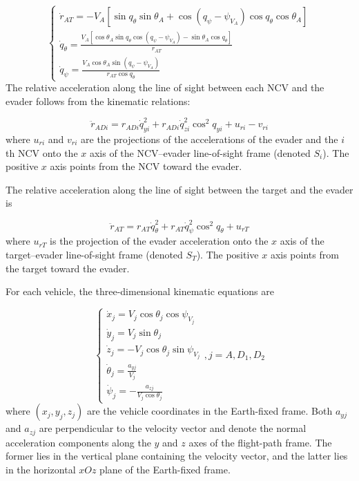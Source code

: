 \begin{equation}
\label{eq:2}
\left\{ {\begin{array}{*{20}{l}}
  {{{\dot r}_{AT}} =  - {V_A}\left[ {\sin {q_\theta }\sin {\theta _A} + \cos \left( {{q_\psi } - {\psi _{{V_A}}}} \right)\cos {q_\theta }\cos {\theta _A}} \right]} \\ 
  {{{\dot q}_\theta } = \frac{{{V_A}\left[ {\cos {\theta _A}\sin {q_\theta }\cos \left( {{q_\psi } - {\psi _{{V_A}}}} \right) - \sin {\theta _A}\cos {q_\theta }} \right]}}{{{r_{AT}}}}} \\ 
  {{{\dot q}_\psi } = \frac{{{V_A}\cos {\theta _A}\sin \left( {{q_\psi } - {\psi _{{V_A}}}} \right)}}{{{r_{AT}}\cos {q_\theta }}}} 
\end{array}} \right.
\end{equation}
The relative acceleration along the line of sight between each NCV and the evader follows from the kinematic relations:

\begin{equation}
\label{eq:3}
{\ddot r_{ADi}} = {r_{ADi}}\dot q_{yi}^2 + {r_{ADi}}\dot q_{zi}^2{\cos ^2}{q_{yi}} + {u_{ri}} - {v_{ri}}
\end{equation}
where ${u_{ri}}$ and ${v_{ri}}$ are the projections of the accelerations of the evader and the $i$th NCV onto the $x$ axis of the NCV--evader line-of-sight frame (denoted ${S_i}$). The positive $x$ axis points from the NCV toward the evader.

The relative acceleration along the line of sight between the target and the evader is

\begin{equation}
\label{eq:4}
{\ddot r_{AT}} = {r_{AT}}\dot q_\theta ^2 + {r_{AT}}\dot q_\psi ^2{\cos ^2}{q_\theta } + {u_{rT}}
\end{equation}
where ${u_{rT}}$ is the projection of the evader acceleration onto the $x$ axis of the target--evader line-of-sight frame (denoted ${S_T}$). The positive $x$ axis points from the target toward the evader.

For each vehicle, the three-dimensional kinematic equations are

\begin{equation}
\label{eq:5}
\left\{ {\begin{array}{*{20}{l}}
  {{{\dot x}_j} = {V_j}\cos {\theta _j}\cos {\psi _{{V_j}}}} \\ 
  {{{\dot y}_j} = {V_j}\sin {\theta _j}} \\ 
  {{{\dot z}_j} =  - {V_j}\cos {\theta _j}\sin {\psi _{{V_j}}}} \\ 
  {{{\dot \theta }_j} = \frac{{{a_{yj}}}}{{{V_j}}}} \\ 
  {{{\dot \psi }_j} =  - \frac{{{a_{zj}}}}{{{V_j}\cos {\theta _j}}}} 
\end{array},j = A,{D_1},{D_2}} \right.
\end{equation}
where $({x_j},{y_j},{z_j})$ are the vehicle coordinates in the Earth-fixed frame. Both ${a_{yj}}$ and ${a_{zj}}$ are perpendicular to the velocity vector and denote the normal acceleration components along the $y$ and $z$ axes of the flight-path frame. The former lies in the vertical plane containing the velocity vector, and the latter lies in the horizontal $xOz$ plane of the Earth-fixed frame.

